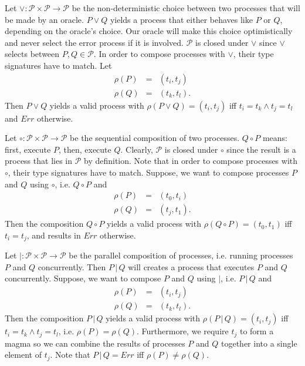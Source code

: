 Let $\vee \colon \mathcal{P} \times \mathcal{P} \to \mathcal{P}$ be the non-deterministic choice between two processes that will be made by an oracle. $P \vee Q$ yields a process that either behaves like $P$ or $Q$, depending on the oracle's choice. Our oracle will make this choice optimistically and never select the error process if it is involved. $\mathcal{P}$ is closed under $\vee$ since $\vee$ selects between $P, Q \in \mathcal{P}$. In order to compose processes with $\vee$, their type signatures have to match. Let
\begin{eqnarray*}
  \rho \left( P \right) & = & \left( t_i, t_j \right) \\
  \rho \left( Q \right) & = & \left( t_k, t_l \right).
\end{eqnarray*}
Then $P \vee Q$ yields a valid process with $\rho \left( P \vee Q \right) = \left( t_i, t_j \right)$ iff $t_i = t_k \wedge t_j = t_l$ and $Err$ otherwise. 

Let $\circ \colon \mathcal{P} \times \mathcal{P} \to \mathcal{P}$ be the sequential composition of two processes. $Q \circ P$ means: first, execute $P$, then, execute $Q$. Clearly, $\mathcal{P}$ is closed under $\circ$ since the result is a process that lies in $\mathcal{P}$ by definition. Note that in order to compose processes with $\circ$, their type signatures have to match. Suppose, we want to compose processes $P$ and $Q$ using $\circ$, i.e. $Q \circ P$ and
\begin{eqnarray*}
  \rho \left( P \right) & = & \left( t_0, t_i \right) \\
  \rho \left( Q \right) & = & \left( t_j, t_1 \right).
\end{eqnarray*}
Then the composition $Q \circ P$ yields a valid process with $\rho \left( Q \circ P \right) = \left( t_0, t_1 \right)$ iff $t_i = t_j$, and results in $Err$ otherwise. 

Let $| \colon \mathcal{P} \times \mathcal{P} \to \mathcal{P}$ be the parallel composition of processes, i.e. running processes $P$ and $Q$ concurrently. Then $P \,|\, Q$ will creates a process that executes $P$ and $Q$ concurrently. Suppose, we want to compose $P$ and $Q$ using $|$, i.e. $P \,|\, Q$ and
\begin{eqnarray*}
  \rho \left( P \right) & = & \left( t_i, t_j \right) \\
  \rho \left( Q \right) & = & \left( t_k, t_l \right).
\end{eqnarray*}
Then the composition $P \,|\, Q$ yields a valid process with $\rho \left( P \,|\, Q \right) = \left( t_i, t_j \right)$ iff $t_i = t_k \wedge t_j = t_l$, i.e. $\rho \left( P \right) = \rho \left( Q \right)$. Furthermore, we require $t_j$ to form a magma so we can combine the results of processes $P$ and $Q$ together into a single element of $t_j$. Note that $P \,|\, Q = Err$ iff $\rho \left( P \right) \neq \rho \left( Q \right)$.

